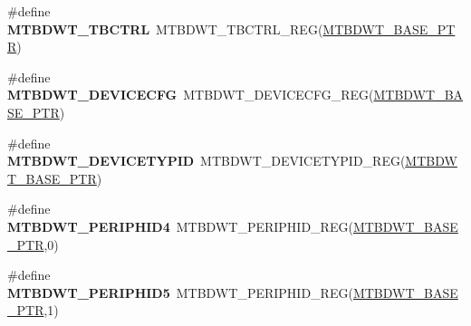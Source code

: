 \begin{DoxyCompactItemize}
\item 
\hypertarget{group___m_t_b_d_w_t___register___accessor___macros_gaabe3e4c27fdc7c18a745c1129d06a68d}{}\#define {\bfseries M\+T\+B\+D\+W\+T\+\_\+\+T\+B\+C\+T\+R\+L}~M\+T\+B\+D\+W\+T\+\_\+\+T\+B\+C\+T\+R\+L\+\_\+\+R\+E\+G(\hyperlink{group___m_t_b_d_w_t___peripheral_ga97d048bfb5a11293a38c444b8347ff42}{M\+T\+B\+D\+W\+T\+\_\+\+B\+A\+S\+E\+\_\+\+P\+T\+R})\label{group___m_t_b_d_w_t___register___accessor___macros_gaabe3e4c27fdc7c18a745c1129d06a68d}

\item 
\hypertarget{group___m_t_b_d_w_t___register___accessor___macros_ga5d85a355ea3763f3ce91c860b33ecd40}{}\#define {\bfseries M\+T\+B\+D\+W\+T\+\_\+\+D\+E\+V\+I\+C\+E\+C\+F\+G}~M\+T\+B\+D\+W\+T\+\_\+\+D\+E\+V\+I\+C\+E\+C\+F\+G\+\_\+\+R\+E\+G(\hyperlink{group___m_t_b_d_w_t___peripheral_ga97d048bfb5a11293a38c444b8347ff42}{M\+T\+B\+D\+W\+T\+\_\+\+B\+A\+S\+E\+\_\+\+P\+T\+R})\label{group___m_t_b_d_w_t___register___accessor___macros_ga5d85a355ea3763f3ce91c860b33ecd40}

\item 
\hypertarget{group___m_t_b_d_w_t___register___accessor___macros_gae3c0de787e5ffb8689542299ac138e16}{}\#define {\bfseries M\+T\+B\+D\+W\+T\+\_\+\+D\+E\+V\+I\+C\+E\+T\+Y\+P\+I\+D}~M\+T\+B\+D\+W\+T\+\_\+\+D\+E\+V\+I\+C\+E\+T\+Y\+P\+I\+D\+\_\+\+R\+E\+G(\hyperlink{group___m_t_b_d_w_t___peripheral_ga97d048bfb5a11293a38c444b8347ff42}{M\+T\+B\+D\+W\+T\+\_\+\+B\+A\+S\+E\+\_\+\+P\+T\+R})\label{group___m_t_b_d_w_t___register___accessor___macros_gae3c0de787e5ffb8689542299ac138e16}

\item 
\hypertarget{group___m_t_b_d_w_t___register___accessor___macros_ga8ef257fe5f8d95bd784008c0fed9375e}{}\#define {\bfseries M\+T\+B\+D\+W\+T\+\_\+\+P\+E\+R\+I\+P\+H\+I\+D4}~M\+T\+B\+D\+W\+T\+\_\+\+P\+E\+R\+I\+P\+H\+I\+D\+\_\+\+R\+E\+G(\hyperlink{group___m_t_b_d_w_t___peripheral_ga97d048bfb5a11293a38c444b8347ff42}{M\+T\+B\+D\+W\+T\+\_\+\+B\+A\+S\+E\+\_\+\+P\+T\+R},0)\label{group___m_t_b_d_w_t___register___accessor___macros_ga8ef257fe5f8d95bd784008c0fed9375e}

\item 
\hypertarget{group___m_t_b_d_w_t___register___accessor___macros_ga784ae33118477a2b68ce261e0caf4b85}{}\#define {\bfseries M\+T\+B\+D\+W\+T\+\_\+\+P\+E\+R\+I\+P\+H\+I\+D5}~M\+T\+B\+D\+W\+T\+\_\+\+P\+E\+R\+I\+P\+H\+I\+D\+\_\+\+R\+E\+G(\hyperlink{group___m_t_b_d_w_t___peripheral_ga97d048bfb5a11293a38c444b8347ff42}{M\+T\+B\+D\+W\+T\+\_\+\+B\+A\+S\+E\+\_\+\+P\+T\+R},1)\label{group___m_t_b_d_w_t___register___accessor___macros_ga784ae33118477a2b68ce261e0caf4b85}


\end{DoxyCompactItemize}
